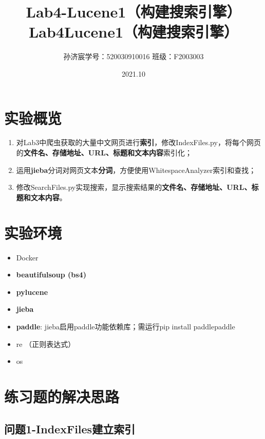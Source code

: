 \documentclass[12pt,a4paper]{article}
\title{Lab4-Lucene1（构建搜索引擎）}
\title{Lab4\quad Lucene1（构建搜索引擎）}
\date{2021.10}
\author{孙济宸\quad \quad 学号：520030910016 \quad  \quad 班级：F2003003}
\begin{document}
\maketitle
\section{实验概览}
\begin{enumerate}
	\item 对Lab3中爬虫获取的大量中文网页进行\textbf{索引}，修改IndexFiles.py，将每个网页的\textbf{文件名、存储地址、URL、标题和文本内容}索引化；
	\item 运用\textbf{jieba}分词对网页文本\textbf{分词}，方便使用WhitespaceAnalyzer索引和查找；
	\item 修改SearchFiles.py实现搜索，显示搜索结果的\textbf{文件名、存储地址、URL、标题和文本内容}。
\end{enumerate}
\section{实验环境}
\begin{itemize}
	\item Docker
	\item \textbf{beautifulsoup (bs4)}
	\item \textbf{pylucene}
	\item \textbf{jieba}
	\item \textbf{paddle}: jieba启用paddle功能依赖库；需运行pip install paddlepaddle
	\item re （正则表达式）
	\item os

\end{itemize}
\newpage

\section{练习题的解决思路}
\subsection{问题1-IndexFiles建立索引}
\end{document}
